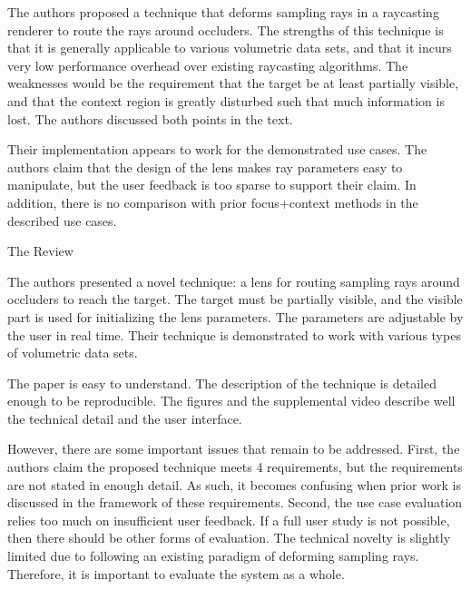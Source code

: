 \documentclass[a4paper,10pt]{article}
\begin{document}
The authors proposed a technique that deforms sampling rays in a raycasting
    renderer to route the rays around occluders. The strengths of this technique is
    that it is generally applicable to various volumetric data sets, and that it
    incurs very low performance overhead over existing raycasting algorithms. The
    weaknesses would be the requirement that the target be at least partially visible,
    and that the context region is greatly disturbed such that much information is
    lost. The authors discussed both points in the text.

    Their implementation appears to work for the demonstrated use cases. The authors
    claim that the design of the lens makes ray parameters easy to manipulate, but the
    user feedback is too sparse to support their claim. In addition, there is no
    comparison with prior focus+context methods in the described use cases.

  The Review

    The authors presented a novel technique: a lens for routing sampling rays around
    occluders to reach the target. The target must be partially visible, and the
    visible part is used for initializing the lens parameters. The parameters are
    adjustable by the user in real time. Their technique is demonstrated to work with
    various types of volumetric data sets.

    The paper is easy to understand. The description of the technique is detailed
    enough to be reproducible. The figures and the supplemental video describe well
    the technical detail and the user interface.

    However, there are some important issues that remain to be addressed. First, the
    authors claim the proposed technique meets 4 requirements, but the requirements
    are not stated in enough detail. As such, it becomes confusing when prior work is
    discussed in the framework of these requirements. Second, the use case evaluation
    relies too much on insufficient user feedback. If a full user study is not
    possible, then there should be other forms of evaluation. The technical novelty is
    slightly limited due to following an existing paradigm of deforming sampling rays.
    Therefore, it is important to evaluate the system as a whole.
\end{document}
